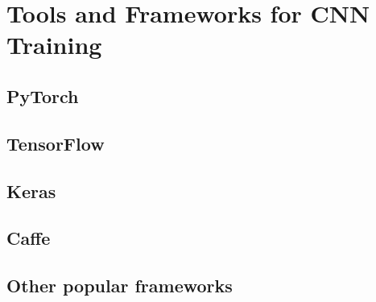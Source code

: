 
\chapter{Tools and Frameworks for CNN Training}

\section{PyTorch}
\section{TensorFlow}
\section{Keras}
\section{Caffe}
\section{Other popular frameworks}